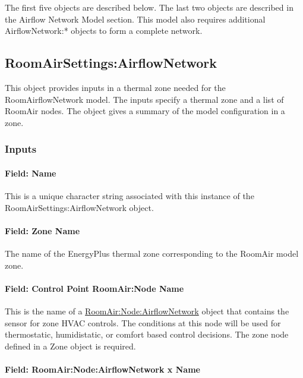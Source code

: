 The first five objects are described below. The last two objects are described in the Airflow Network Model section. This model also requires additional AirflowNetwork:* objects to form a complete network.

\subsection{RoomAirSettings:AirflowNetwork}\label{roomairsettingsairflownetwork}

This object provides inputs in a thermal zone needed for the RoomAirflowNetwork model. The inputs specify a thermal zone and a list of RoomAir nodes. The object gives a summary of the model configuration in a zone.

\subsubsection{Inputs}\label{inputs-12-015}

\paragraph{Field: Name}\label{field-name-7-017}

This is a unique character string associated with this instance of the Room\-Air\-Settings:\-Air\-flow\-Net\-work object.

\paragraph{Field: Zone Name}\label{field-zone-name-8-002}

The name of the EnergyPlus thermal zone corresponding to the RoomAir model zone.

\paragraph{Field: Control Point RoomAir:Node Name}\label{field-control-point-roomairnode-name}

This is the name of a \hyperref[roomairnodeairflownetwork]{RoomAir:Node:AirflowNetwork} object that contains the sensor for zone HVAC controls. The conditions at this node will be used for thermostatic, humidistatic, or comfort based control decisions. The zone node defined in a Zone object is required.

\paragraph{Field: RoomAir:Node:AirflowNetwork x Name}\label{field-roomairnodeairflownetwork-x-name}

